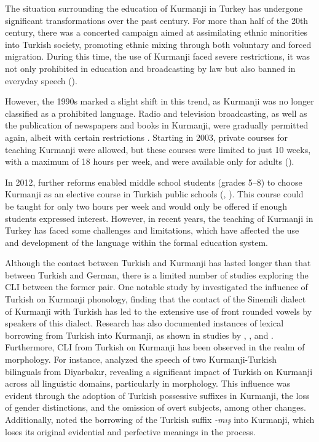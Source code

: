 The situation surrounding the education of Kurmanji in Turkey has undergone significant transformations over the past century. For more than half of the 20th century, there was a concerted campaign aimed at assimilating ethnic minorities into Turkish society, promoting ethnic mixing through both voluntary and forced migration. During this time, the use of Kurmanji faced severe restrictions, it was not only prohibited in education and broadcasting by law but also banned in everyday speech (\citealt{Zeydanlioglu2012}).

However, the 1990s marked a slight shift in this trend, as Kurmanji was no longer classified as a prohibited language. Radio and television broadcasting, as well as the publication of newspapers and books in Kurmanji, were gradually permitted again, albeit with certain restrictions \citep{Derince2013}. Starting in 2003, private courses for teaching Kurmanji were allowed, but these courses were limited to just 10 weeks, with a maximum of 18 hours per week, and were available only for adults (\citealt{Zeydanlioglu2012}).

In 2012, further reforms enabled middle school students (grades 5--8) to choose Kurmanji as an elective course in Turkish public schools (\citealt{Arslan2015}, \citealt{Derince2013}). This course could be taught for only two hours per week and would only be offered if enough students expressed interest. However, in recent years, the teaching of Kurmanji in Turkey has faced some challenges and limitations, which have affected the use and development of the language within the formal education system.

Although the contact between Turkish and Kurmanji has lasted longer than that between Turkish and German, there is a limited number of studies exploring the CLI between the former pair. One notable study by \citet{JohansonTurkyilmaz2006} investigated the influence of Turkish on Kurmanji phonology, finding that the contact of the Sinemili dialect of Kurmanji with Turkish has led to the extensive use of front rounded vowels by speakers of this dialect. Research has also documented instances of lexical borrowing from Turkish into Kurmanji, as shown in studies by \citet{Bulut2006}, \citet{Dorleijn1996, Dorleijn2006}, and \citet{Cabuk2020}. Furthermore, CLI from Turkish on Kurmanji has been observed in the realm of morphology. For instance, \citet{Dorleijn1996} analyzed the speech of two Kurmanji-Turkish bilinguals from Diyarbakır, revealing a significant impact of Turkish on Kurmanji across all linguistic domains, particularly in morphology. This influence was evident through the adoption of Turkish possessive suffixes in Kurmanji, the loss of gender distinctions, and the omission of overt subjects, among other changes. Additionally, \citet{Cabuk2019} noted the borrowing of the Turkish suffix \textit{-mış} into Kurmanji, which loses its original evidential and perfective meanings in the process.


